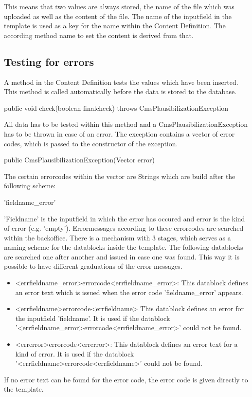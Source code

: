 This means that two values are always stored, the name of the file which was
uploaded as well as the content of the file.
The name of the inputfield in the template is used as a key for the name within 
the Content Definition. The according method name to set the content is 
derived from that.

\subsection{Testing for errors}
A method in the Content Definition tests the values which have been inserted.
This method is called automatically before the data is stored to the database.

\begin{java}
public void check(boolean finalcheck) throws CmsPlausibilizationException
\end{java}

All data has to be tested within this method and a CmsPlausibilizationException
has to be thrown in case of an error. The exception contains a vector of 
error codes, which is passed to the constructor of the exception.

\begin{java}
public CmsPlausibilizationException(Vector error)
\end{java}

The certain errorcodes within the vector are Strings which are build 
after the following scheme:

'fieldname\_error'

'Fieldname' is the inputfield in which the error has occured and error is
the kind of error (e.g. 'empty'). Errormessages according to these errorcodes
are searched within the backoffice. There is a mechanism with 3 stages, which
serves as a naming scheme for the datablocks inside the template. The following
datablocks are searched one after another and issued in case one was found.
This way it is possible to have different graduations of the error messages.

\begin{itemize}
\item <errfieldname\_error>errorcode<errfieldname\_error>: This datablock 
    defines an error text which is issued when the error code
    'fieldname\_error' appears.
\item <errfieldname>errorcode<errfieldname> This datablock defines
    an error for the inputfield 'fieldname'. It is used if the 
    datablock \\
    '<errfieldname\_error>errorcode<errfieldname\_error>' could
    not be found.
\item <errerror>errorcode<errerror>: This datablock defines an error text for
    a kind of error. It is used if the datablock 
    '<errfieldname>errorcode<errfieldname>' could not be found.
\end{itemize}

If no error text can be found for the error code, the error code is given 
directly to the template.




